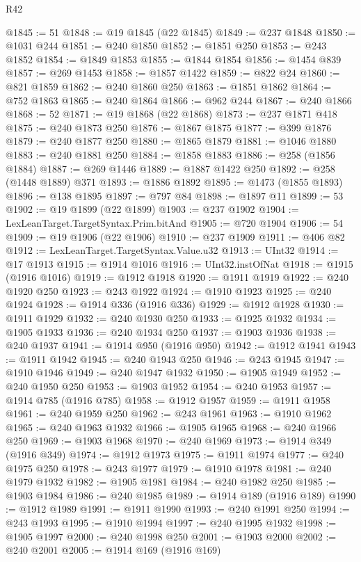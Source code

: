 \begin{lexlean}{R42}
\begin{coremodule}
{@1845 := 51
@1848 := @19 @1845 (@22 @1845)
@1849 := @237 @1848
@1850 := @1031 @244
@1851 := @240 @1850
@1852 := @1851 @250
@1853 := @243 @1852
@1854 := @1849 @1853
@1855 := @1844 @1854
@1856 := @1454 @839
@1857 := @269 @1453
@1858 := @1857 @1422
@1859 := @822 @24
@1860 := @821 @1859
@1862 := @240 @1860 @250
@1863 := @1851 @1862
@1864 := @752 @1863
@1865 := @240 @1864
@1866 := @962 @244
@1867 := @240 @1866
@1868 := 52
@1871 := @19 @1868 (@22 @1868)
@1873 := @237 @1871 @418
@1875 := @240 @1873 @250
@1876 := @1867 @1875
@1877 := @399 @1876
@1879 := @240 @1877 @250
@1880 := @1865 @1879
@1881 := @1046 @1880
@1883 := @240 @1881 @250
@1884 := @1858 @1883
@1886 := @258 (@1856 @1884)
@1887 := @269 @1446
@1889 := @1887 @1422 @250
@1892 := @258 (@1448 @1889) @371
@1893 := @1886 @1892
@1895 := @1473 (@1855 @1893)
@1896 := @138 @1895
@1897 := @797 @84
@1898 := @1897 @11
@1899 := 53
@1902 := @19 @1899 (@22 @1899)
@1903 := @237 @1902
@1904 := LexLeanTarget.TargetSyntax.Prim.bitAnd
@1905 := @720 @1904
@1906 := 54
@1909 := @19 @1906 (@22 @1906)
@1910 := @237 @1909
@1911 := @406 @82
@1912 := LexLeanTarget.TargetSyntax.Value.u32
@1913 := UInt32
@1914 := @17 @1913
@1915 := @1914 @1016
@1916 := UInt32.instOfNat
@1918 := @1915 (@1916 @1016)
@1919 := @1912 @1918
@1920 := @1911 @1919
@1922 := @240 @1920 @250
@1923 := @243 @1922
@1924 := @1910 @1923
@1925 := @240 @1924
@1928 := @1914 @336 (@1916 @336)
@1929 := @1912 @1928
@1930 := @1911 @1929
@1932 := @240 @1930 @250
@1933 := @1925 @1932
@1934 := @1905 @1933
@1936 := @240 @1934 @250
@1937 := @1903 @1936
@1938 := @240 @1937
@1941 := @1914 @950 (@1916 @950)
@1942 := @1912 @1941
@1943 := @1911 @1942
@1945 := @240 @1943 @250
@1946 := @243 @1945
@1947 := @1910 @1946
@1949 := @240 @1947 @1932
@1950 := @1905 @1949
@1952 := @240 @1950 @250
@1953 := @1903 @1952
@1954 := @240 @1953
@1957 := @1914 @785 (@1916 @785)
@1958 := @1912 @1957
@1959 := @1911 @1958
@1961 := @240 @1959 @250
@1962 := @243 @1961
@1963 := @1910 @1962
@1965 := @240 @1963 @1932
@1966 := @1905 @1965
@1968 := @240 @1966 @250
@1969 := @1903 @1968
@1970 := @240 @1969
@1973 := @1914 @349 (@1916 @349)
@1974 := @1912 @1973
@1975 := @1911 @1974
@1977 := @240 @1975 @250
@1978 := @243 @1977
@1979 := @1910 @1978
@1981 := @240 @1979 @1932
@1982 := @1905 @1981
@1984 := @240 @1982 @250
@1985 := @1903 @1984
@1986 := @240 @1985
@1989 := @1914 @189 (@1916 @189)
@1990 := @1912 @1989
@1991 := @1911 @1990
@1993 := @240 @1991 @250
@1994 := @243 @1993
@1995 := @1910 @1994
@1997 := @240 @1995 @1932
@1998 := @1905 @1997
@2000 := @240 @1998 @250
@2001 := @1903 @2000
@2002 := @240 @2001
@2005 := @1914 @169 (@1916 @169)
}
\end{coremodule}
\end{lexlean}
